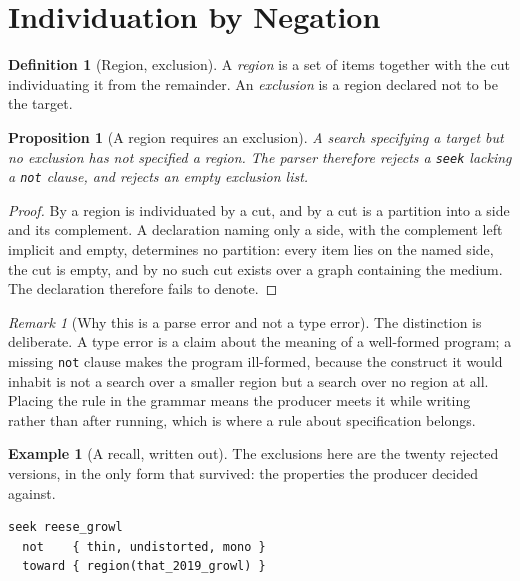 \documentclass[11pt,twocolumn,a4paper]{article}
\newtheorem{proposition}[theorem]{Proposition}
\theoremstyle{definition}
\newtheorem{definition}[theorem]{Definition}
\newtheorem{example}[theorem]{Example}
\theoremstyle{remark}
\newtheorem{remark}[theorem]{Remark}
\begin{document}
\section{Individuation by Negation}
\label{sec:individuation}

\begin{definition}[Region, exclusion]
\label{def:region}
A \emph{region} is a set of items together with the cut individuating it from the
remainder. An \emph{exclusion} is a region declared not to be the target.
\end{definition}

\begin{proposition}[A region requires an exclusion]
\label{prop:mandatory-not}
A search specifying a target but no exclusion has not specified a region. The
parser therefore rejects a \texttt{seek} lacking a \texttt{not} clause, and
rejects an empty exclusion list.
\end{proposition}

\begin{proof}
By  a region is individuated by a cut, and by
 a cut is a partition into a side and its complement. A
declaration naming only a side, with the complement left implicit and empty,
determines no partition: every item lies on the named side, the cut is empty, and
by  no such cut exists over a graph containing the medium. The
declaration therefore fails to denote.
\end{proof}

\begin{remark}[Why this is a parse error and not a type error]
\label{rem:parse-not-type}
The distinction is deliberate. A type error is a claim about the meaning of a
well-formed program; a missing \texttt{not} clause makes the program ill-formed,
because the construct it would inhabit is not a search over a smaller region but
a search over no region at all. Placing the rule in the grammar means the
producer meets it while writing rather than after running, which is where a rule
about specification belongs.
\end{remark}

\begin{example}[A recall, written out]
\label{ex:recall}
The exclusions here are the twenty rejected versions, in the only form that
survived: the properties the producer decided against.

\begin{lstlisting}
seek reese_growl
  not    { thin, undistorted, mono }
  toward { region(that_2019_growl) }
\end{lstlisting}
\end{example}
\end{document}

